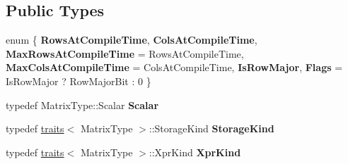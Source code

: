 \subsection*{Public Types}
\begin{DoxyCompactItemize}
\item 
\mbox{\label{struct_eigen_1_1internal_1_1traits_3_01_replicate_3_01_matrix_type_00_01_row_factor_00_01_col_factor_01_4_01_4_a3e70e6e7ef296b3a5233724cb97aa02e}} 
enum \{ \newline
{\bfseries Rows\+At\+Compile\+Time}, 
{\bfseries Cols\+At\+Compile\+Time}, 
{\bfseries Max\+Rows\+At\+Compile\+Time} = Rows\+At\+Compile\+Time, 
{\bfseries Max\+Cols\+At\+Compile\+Time} = Cols\+At\+Compile\+Time, 
\newline
{\bfseries Is\+Row\+Major}, 
{\bfseries Flags} = Is\+Row\+Major ? Row\+Major\+Bit \+: 0
 \}
\item 
\mbox{\label{struct_eigen_1_1internal_1_1traits_3_01_replicate_3_01_matrix_type_00_01_row_factor_00_01_col_factor_01_4_01_4_abc7e2bd9b52486df3c210a519b8b5ab6}} 
typedef Matrix\+Type\+::\+Scalar {\bfseries Scalar}
\item 
\mbox{\label{struct_eigen_1_1internal_1_1traits_3_01_replicate_3_01_matrix_type_00_01_row_factor_00_01_col_factor_01_4_01_4_a897e1e1f1b3bf8a29a9f193eb2b123f2}} 
typedef \mbox{\hyperlink{struct_eigen_1_1internal_1_1traits}{traits}}$<$ Matrix\+Type $>$\+::Storage\+Kind {\bfseries Storage\+Kind}
\item 
\mbox{\label{struct_eigen_1_1internal_1_1traits_3_01_replicate_3_01_matrix_type_00_01_row_factor_00_01_col_factor_01_4_01_4_a5ddda540570c1b22e5bea509852ef2ce}} 
typedef \mbox{\hyperlink{struct_eigen_1_1internal_1_1traits}{traits}}$<$ Matrix\+Type $>$\+::Xpr\+Kind {\bfseries Xpr\+Kind}
\item 
\mbox{\label{struct_eigen_1_1internal_1_1traits_3_01_replicate_3_01_matrix_type_00_01_row_factor_00_01_col_factor_01_4_01_4_a06094f652fe7d281b1febd7252bfd1b9}} 

\end{DoxyCompactItemize}
